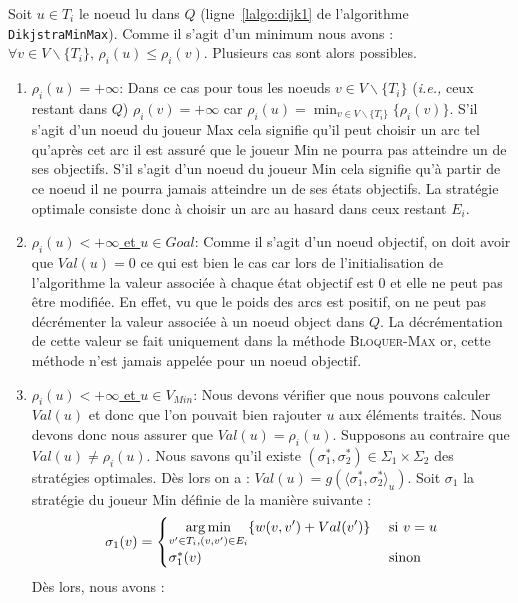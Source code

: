 Soit $u \in T_i$ le noeud lu dans $Q$ (ligne~\ref{lalgo:dijk1} de l'algorithme \verb|DikjstraMinMax|). Comme il s'agit d'un minimum nous avons : $\forall v \in V\backslash \{ T_i \},\, \rho_i(u) \leq \rho_i(v)$. Plusieurs cas sont alors possibles. 

\begin{enumerate}
	\item \underline{$\rho_i(u) = +\infty$}: Dans ce cas pour tous les noeuds $v \in V\backslash \{ T_i \}$ (\emph{i.e.,} ceux restant dans $Q$) $\rho_i(v) = + \infty$ car $\rho_i(u) = \min _{v \in V\backslash \{ T_i \}} \{\rho_i(v)\}$. S'il s'agit d'un noeud du joueur Max cela signifie qu'il peut choisir un arc tel qu'après cet arc il est assuré que le joueur Min ne pourra pas atteindre un de ses objectifs. S'il s'agit d'un noeud du joueur Min cela signifie qu'à partir de ce noeud il ne pourra jamais atteindre un de ses états objectifs. La stratégie optimale consiste donc à choisir un arc au hasard dans ceux restant $E_i$.
	\item\underline{$\rho_i(u) < +\infty$ et $u \in Goal$}: Comme il s'agit d'un noeud objectif, on doit avoir que $Val(u) = 0$ ce qui est bien le cas car lors de l'initialisation de l'algorithme la valeur associée à chaque état objectif est 0 et elle ne peut pas être modifiée. En effet, vu que le poids des arcs est positif, on ne peut pas décrémenter la valeur associée à un noeud object dans $Q$. La décrémentation de cette valeur se fait uniquement dans la méthode \textsc{Bloquer-Max} or, cette méthode n'est jamais appelée pour un noeud objectif.
	
	\item\underline{$\rho_i(u) < +\infty$ et $u \in V_{Min}$}: Nous devons vérifier que nous pouvons calculer $Val(u)$ et donc que l'on pouvait bien rajouter $u$ aux éléments traités. Nous devons donc nous assurer que $Val(u) = \rho_i(u)$.
	Supposons au contraire que $Val(u) \neq \rho_i(u)$. Nous savons qu'il existe $(\sigma_1^*,\sigma_2^*) \in \Sigma_1 \times \Sigma_2 $ des stratégies optimales. Dès lors on a : $Val(u) = g(\langle \sigma_1^*, \sigma_2^* \rangle_u)$. Soit $\sigma_1$ la stratégie du joueur Min définie de la manière suivante : $$  \sigma_1(v) = \begin{cases}
											\displaystyle	\operatorname*{arg\,min}_{v'\in T_i,(v,v')\in E_i} \{ w(v,v') + Val(v') \} & \text{ si } v = u\\
												\sigma_1^*(v) &\text{ sinon} \end{cases}$$
Dès lors, nous avons : 


\end{enumerate}
